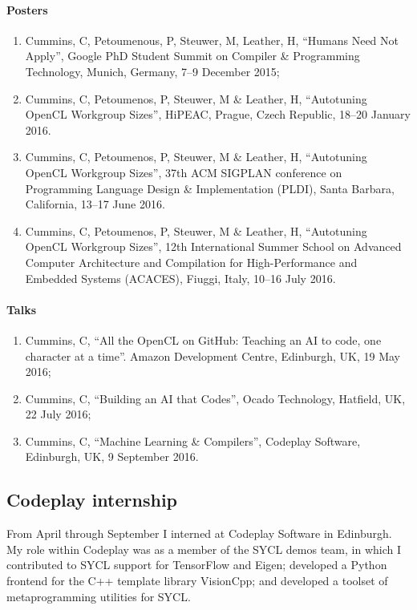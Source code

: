 \paragraph{Posters}
\begin{enumerate}
  \item Cummins, C, Petoumenous, P, Steuwer, M, Leather, H, ``Humans Need Not Apply'', Google PhD Student Summit on Compiler \& Programming Technology, Munich, Germany, 7--9 December 2015;
  \item Cummins, C, Petoumenos, P, Steuwer, M \& Leather, H, ``Autotuning OpenCL Workgroup Sizes'', HiPEAC, Prague, Czech Republic, 18--20 January 2016.
  \item Cummins, C, Petoumenos, P, Steuwer, M \& Leather, H, ``Autotuning OpenCL Workgroup Sizes'', 37th ACM SIGPLAN conference on Programming Language Design \& Implementation (PLDI), Santa Barbara, California, 13--17 June 2016.
  \item Cummins, C, Petoumenos, P, Steuwer, M \& Leather, H, ``Autotuning OpenCL Workgroup Sizes'', 12th International Summer School on Advanced Computer Architecture and Compilation for High-Performance and Embedded Systems (ACACES), Fiuggi, Italy, 10--16 July 2016.
\end{enumerate}

\paragraph{Talks}
\begin{enumerate}
  \item Cummins, C, ``All the OpenCL on GitHub: Teaching an AI to code, one character at a time''. Amazon Development Centre, Edinburgh, UK, 19 May 2016;
  \item Cummins, C, ``Building an AI that Codes'', Ocado Technology, Hatfield, UK, 22 July 2016;
  \item Cummins, C, ``Machine Learning \& Compilers'', Codeplay Software, Edinburgh, UK, 9 September 2016.
\end{enumerate}


\subsection{Codeplay internship}

From April through September I interned at Codeplay Software in Edinburgh. My role within Codeplay was as a member of the SYCL demos team, in which I contributed to SYCL support for TensorFlow and Eigen; developed a Python frontend for the C++ template library VisionCpp; and developed a toolset of metaprogramming utilities for SYCL.


